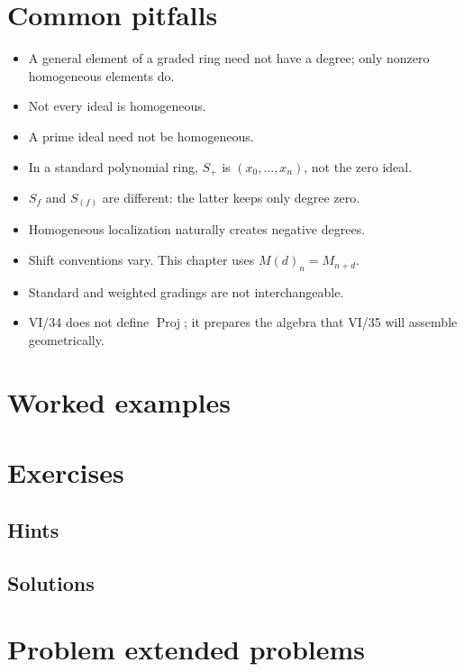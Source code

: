 \section{Common pitfalls}
\begin{itemize}
\item A general element of a graded ring need not have a degree; only nonzero homogeneous elements do.
\item Not every ideal is homogeneous.
\item A prime ideal need not be homogeneous.
\item In a standard polynomial ring, \(S_+\) is \((x_0,\ldots,x_n)\), not the zero ideal.
\item \(S_f\) and \(S_{(f)}\) are different: the latter keeps only degree zero.
\item Homogeneous localization naturally creates negative degrees.
\item Shift conventions vary. This chapter uses \(M(d)_n=M_{n+d}\).
\item Standard and weighted gradings are not interchangeable.
\item VI/34 does not define \(\operatorname{Proj}\); it prepares the algebra that VI/35 will assemble geometrically.
\end{itemize}

\section{Worked examples}


\section{Exercises}


\ifdefined\IncludeExerciseHints
\subsection*{Hints}

\fi

\ifdefined\IncludeExerciseSolutions
\subsection*{Solutions}

\fi

\section{Problem extended problems}


